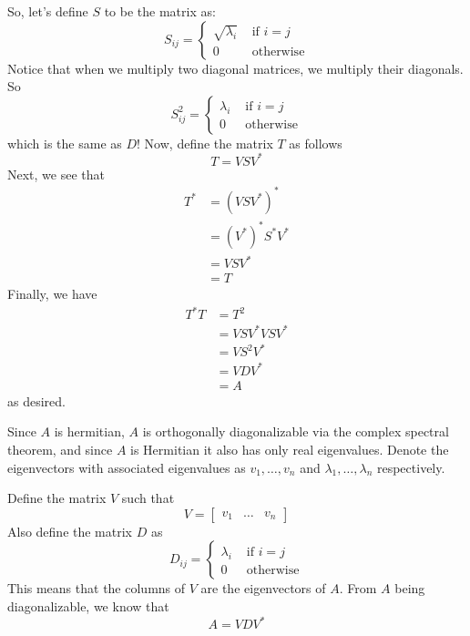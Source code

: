 \documentclass[answers]{exam}
\begin{document}
\begin{questions}
\begin{solution}
        So, let's define $S$ to be the matrix as:
        \[
            S_{ij} = \begin{cases}
                \sqrt{\lambda_i} & \text{ if }i=j \\
                0                & \text{ otherwise}
            \end{cases}
        \]
        Notice that when we multiply two diagonal matrices, we multiply their diagonals. So
        \[
            S_{ij}^2 = \begin{cases}
                \lambda_i & \text{ if }i=j \\
                0                & \text{ otherwise}
            \end{cases}
        \]
        which is the same as $D$! Now, define the matrix $T$ as follows
        \[
            T = VSV^*
        \]
        Next, we see that 
        \begin{align*}
            T^* &= \left(VSV^*\right)^* \\
            &= \left(V^*\right)^*S^*V^* \\
            &= VSV^* \\
            &= T
        \end{align*}
        Finally, we have
        \begin{align*}
            T^*T &= T^2 \\
            &= VSV^*VSV^*\\
            &= VS^2V^* \\
            &= VDV^*\\
            &= A
        \end{align*}
        as desired.


        Since $A$ is hermitian, $A$ is orthogonally diagonalizable via the complex spectral theorem, and since $A$
        is Hermitian it also has only real eigenvalues. Denote the eigenvectors with associated eigenvalues as
        $v_1,\dots,v_n$ and $\lambda_1,\dots,\lambda_n$ respectively.

        Define the matrix $V$ such that 
        \[
            V = \begin{bmatrix} v_1 & \dots & v_n \end{bmatrix}
        \]
        Also define the matrix $D$ as
        \[
            D_{ij} = \begin{cases} \lambda_i & \text{ if }i=j\\
                0   & \text{ otherwise}
            \end{cases}
        \]
        This means that the columns of $V$ are the eigenvectors of $A$. From $A$ being diagonalizable, we know
        that
        \[
            A = VDV^*
        \]


\end{solution}
\end{questions}
\end{document}
